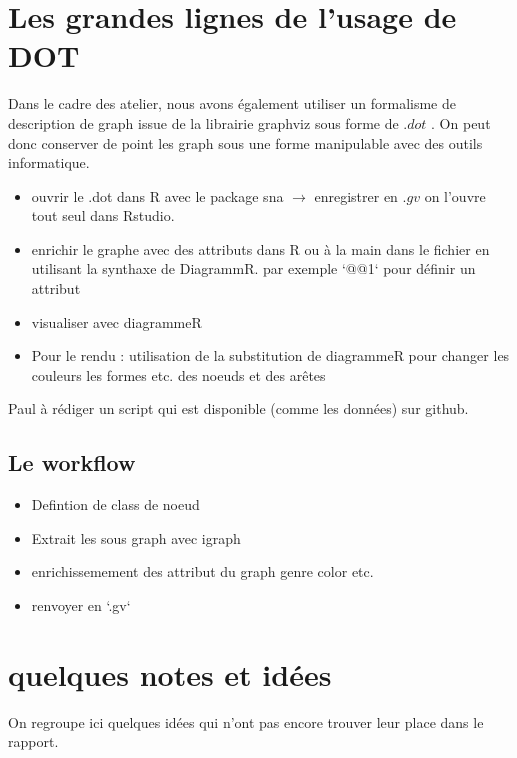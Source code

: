 \section{Les grandes lignes de l'usage de DOT}

Dans le cadre des atelier, nous avons également utiliser un formalisme de description de graph issue de la librairie graphviz sous forme de $.dot$ . On peut donc conserver de point les graph sous une forme manipulable avec des outils informatique.

\begin{itemize}
  \item ouvrir le .dot dans R avec le package sna $\longrightarrow$ enregistrer en $.gv$ on l'ouvre tout seul dans Rstudio.
  \item enrichir le graphe avec des attributs dans R ou à la main dans le fichier en utilisant la synthaxe de DiagrammR. par exemple `@@1` pour définir un attribut
  \item visualiser avec diagrammeR
  \item Pour le rendu : utilisation de la substitution de diagrammeR pour changer les couleurs les formes etc.  des noeuds et des arêtes
\end{itemize}

Paul à rédiger un script qui est disponible (comme les données) sur github.

\subsection{ Le workflow}
\begin{itemize}
  \item Defintion de class de noeud
  \item Extrait les sous graph avec igraph
  \item enrichissemement des attribut du graph genre color etc.
  \item renvoyer en `.gv`
\end{itemize}



\section{quelques notes et idées}

On regroupe ici quelques idées qui n'ont pas encore trouver leur place dans le rapport.


